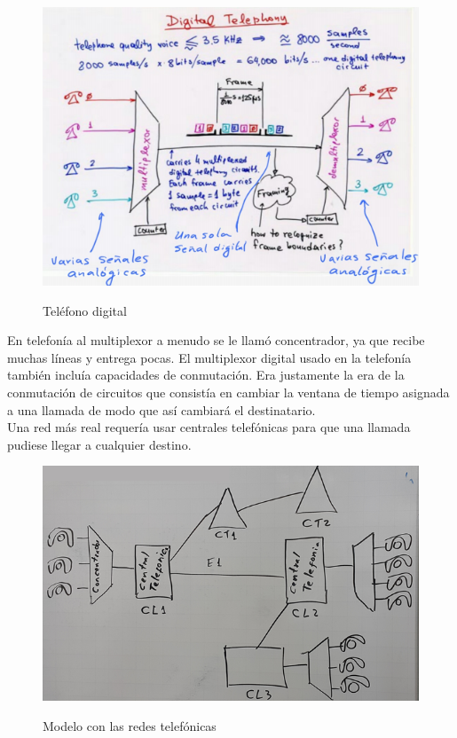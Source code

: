 \begin{figure}[h!]
	\captionsetup{justification = raggedright, singlelinecheck = false}
	\caption{Teléfono digital} 
	\centering
	\includegraphics[scale=1]{Imagenes/Digital-telefono.png}
	\label{fig:Digital-telefono}
\end{figure}

En telefonía al multiplexor a menudo se le llamó concentrador, ya que recibe muchas líneas y entrega pocas.
El multiplexor digital usado en la telefonía también incluía capacidades de conmutación. Era justamente la era de la conmutación de circuitos que consistía en cambiar la ventana de tiempo asignada a una llamada de modo que así cambiará el destinatario. \\

Una red más real requería usar centrales telefónicas para que una llamada pudiese llegar a cualquier destino. \\

\vspace{200px}
\begin{figure}[h!]
	\captionsetup{justification = raggedright, singlelinecheck = false}
	\caption{Modelo con las redes telefónicas} 
	\centering
	\includegraphics[scale=0.7]{Imagenes/Concentrador.png}
	\label{fig:Concentrador}
\end{figure}

